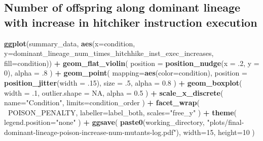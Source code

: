 \documentclass[]{book}
\newenvironment{Shaded}{\begin{snugshade}}{\end{snugshade}}
\newcommand{\DataTypeTok}[1]{\textcolor[rgb]{0.13,0.29,0.53}{#1}}
\newcommand{\DecValTok}[1]{\textcolor[rgb]{0.00,0.00,0.81}{#1}}
\newcommand{\FloatTok}[1]{\textcolor[rgb]{0.00,0.00,0.81}{#1}}
\newcommand{\KeywordTok}[1]{\textcolor[rgb]{0.13,0.29,0.53}{\textbf{#1}}}
\newcommand{\NormalTok}[1]{#1}
\newcommand{\OperatorTok}[1]{\textcolor[rgb]{0.81,0.36,0.00}{\textbf{#1}}}
\newcommand{\OtherTok}[1]{\textcolor[rgb]{0.56,0.35,0.01}{#1}}
\newcommand{\StringTok}[1]{\textcolor[rgb]{0.31,0.60,0.02}{#1}}
\begin{document}
\hypertarget{number-of-offspring-along-dominant-lineage-with-increase-in-hitchiker-instruction-execution}{%
\subsection{Number of offspring along dominant lineage with increase in hitchiker instruction execution}\label{number-of-offspring-along-dominant-lineage-with-increase-in-hitchiker-instruction-execution}}

\begin{Shaded}
\begin{Highlighting}[]
\KeywordTok{ggplot}\NormalTok{(summary_data, }\KeywordTok{aes}\NormalTok{(}\DataTypeTok{x=}\NormalTok{condition, }\DataTypeTok{y=}\NormalTok{dominant_lineage_num_times_hitchhike_inst_exec_increases, }\DataTypeTok{fill=}\NormalTok{condition)) }\OperatorTok{+}
\StringTok{  }\KeywordTok{geom_flat_violin}\NormalTok{(}
    \DataTypeTok{position =} \KeywordTok{position_nudge}\NormalTok{(}\DataTypeTok{x =} \FloatTok{.2}\NormalTok{, }\DataTypeTok{y =} \DecValTok{0}\NormalTok{),}
    \DataTypeTok{alpha =} \FloatTok{.8}
\NormalTok{  ) }\OperatorTok{+}
\StringTok{  }\KeywordTok{geom_point}\NormalTok{(}
    \DataTypeTok{mapping=}\KeywordTok{aes}\NormalTok{(}\DataTypeTok{color=}\NormalTok{condition),}
    \DataTypeTok{position =} \KeywordTok{position_jitter}\NormalTok{(}\DataTypeTok{width =} \FloatTok{.15}\NormalTok{),}
    \DataTypeTok{size =} \FloatTok{.5}\NormalTok{,}
    \DataTypeTok{alpha =} \FloatTok{0.8}
\NormalTok{  ) }\OperatorTok{+}
\StringTok{  }\KeywordTok{geom_boxplot}\NormalTok{(}
    \DataTypeTok{width =} \FloatTok{.1}\NormalTok{,}
    \DataTypeTok{outlier.shape =} \OtherTok{NA}\NormalTok{,}
    \DataTypeTok{alpha =} \FloatTok{0.5}
\NormalTok{  ) }\OperatorTok{+}
\StringTok{  }\KeywordTok{scale_x_discrete}\NormalTok{(}
    \DataTypeTok{name=}\StringTok{"Condition"}\NormalTok{,}
    \DataTypeTok{limits=}\NormalTok{condition_order}
\NormalTok{  ) }\OperatorTok{+}
\StringTok{  }\KeywordTok{facet_wrap}\NormalTok{(}
    \OperatorTok{~}\NormalTok{POISON_PENALTY,}
    \DataTypeTok{labeller=}\NormalTok{label_both,}
    \DataTypeTok{scales=}\StringTok{"free_y"}
\NormalTok{  ) }\OperatorTok{+}
\StringTok{  }\KeywordTok{theme}\NormalTok{(}
    \DataTypeTok{legend.position=}\StringTok{"none"}
\NormalTok{  ) }\OperatorTok{+}
\StringTok{  }\KeywordTok{ggsave}\NormalTok{(}
    \KeywordTok{paste0}\NormalTok{(working_directory, }\StringTok{"plots/final-dominant-lineage-poison-increase-num-mutants-log.pdf"}\NormalTok{),}
    \DataTypeTok{width=}\DecValTok{15}\NormalTok{,}
    \DataTypeTok{height=}\DecValTok{10}
\NormalTok{  )}
\end{Highlighting}
\end{Shaded}
\end{document}
